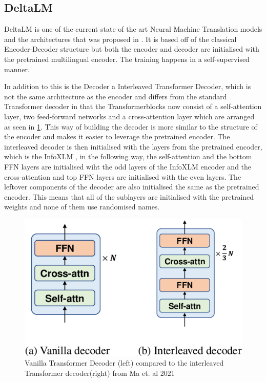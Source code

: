 

\subsection{DeltaLM}
DeltaLM is one of the current state of the art Neural Machine Translation models and the architectures that was proposed in \cite{ma2021deltalm}. It is based off of the classical Encoder-Decoder structure but both the encoder and decoder are initialised with the pretrained multilingual encoder. The training happens in a self-supervised manner. 

In addition to this is the Decoder a Interleaved Transformer Decoder, which is not the same architecture as the encoder and differs from the standard Transformer decoder in that the Transformerblocks now consist of a self-attention layer, two feed-forward networks and a cross-attention layer which are arranged as seen in \ref{fig:interleaved decoder}. 
This way of building the decoder is more similar to the structure of the encoder and makes it easier to leverage the pretrained encoder. The interleaved decoder is then initialised with the layers from the pretrained encoder, which is the InfoXLM \cite{chi2021infoxlminformationtheoreticframeworkcrosslingual}, in the following way, the self-attention and the bottom FFN layers are initialised wiht the odd layers of the InfoXLM encoder and the cross-attention and top FFN layers are initialised with the even layers. The leftover components of the decoder are also initialised the same as the pretrained encoder. This means that all of the sublayers are initialised with the pretrained weights and none of them use randomised names. 

\begin{figure}
    \centering
    \includegraphics[width=0.5\linewidth]{Latex/sections/images/interleaveddecoder.png}
    \caption{Vanilla Transformer Decoder (left) compared to the interleaved Transformer decoder(right) from Ma et. al 2021}
    \label{fig:interleaved decoder}
\end{figure}